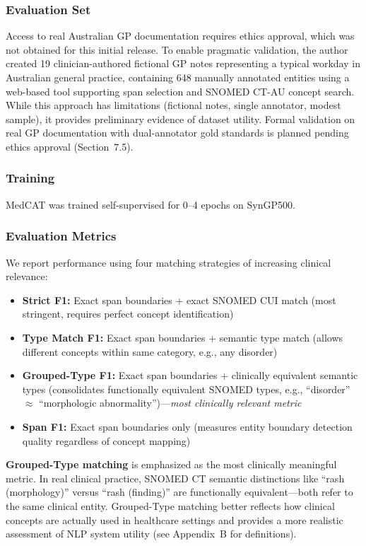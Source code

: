 \documentclass[11pt]{article}
\begin{document}
\subsubsection{Evaluation Set}
Access to real Australian GP documentation requires ethics approval, which was not obtained for this initial release. To enable pragmatic validation, the author created 19 clinician-authored fictional GP notes representing a typical workday in Australian general practice, containing 648 manually annotated entities using a web-based tool supporting span selection and SNOMED CT-AU concept search. While this approach has limitations (fictional notes, single annotator, modest sample), it provides preliminary evidence of dataset utility. Formal validation on real GP documentation with dual-annotator gold standards is planned pending ethics approval (Section~7.5).

\subsubsection{Training}
MedCAT was trained self-supervised for 0--4 epochs on SynGP500.

\subsubsection{Evaluation Metrics}
We report performance using four matching strategies of increasing clinical relevance:
\begin{itemize}[noitemsep]
    \item \textbf{Strict F1:} Exact span boundaries + exact SNOMED CUI match (most stringent, requires perfect concept identification)
    \item \textbf{Type Match F1:} Exact span boundaries + semantic type match (allows different concepts within same category, e.g., any disorder)
    \item \textbf{Grouped-Type F1:} Exact span boundaries + clinically equivalent semantic types (consolidates functionally equivalent SNOMED types, e.g., ``disorder'' $\approx$ ``morphologic abnormality'')—\emph{most clinically relevant metric}
    \item \textbf{Span F1:} Exact span boundaries only (measures entity boundary detection quality regardless of concept mapping)
\end{itemize}

\textbf{Grouped-Type matching} is emphasized as the most clinically meaningful metric. In real clinical practice, SNOMED CT semantic distinctions like ``rash (morphology)'' versus ``rash (finding)'' are functionally equivalent—both refer to the same clinical entity. Grouped-Type matching better reflects how clinical concepts are actually used in healthcare settings and provides a more realistic assessment of NLP system utility (see Appendix~B for definitions).
\end{document}
